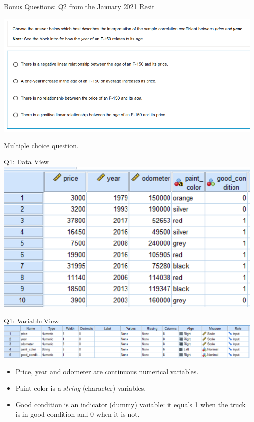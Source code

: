 \documentclass[11pt]{beamer}
\begin{document}
\begin{frame}{Bonus Questions: Q2 from the January 2021 Resit}
  \begin{center}
    \includegraphics[width=\textwidth]{f150-exam-q2.png}
  \end{center}
  Multiple choice question.
\end{frame}

\begin{frame}{Q1: Data View}
  \includegraphics[width=\textwidth]{f150-data-view.png}
\end{frame}

\begin{frame}{Q1: Variable View}
  \includegraphics[width=\textwidth]{f150-variable-view.png}
  \begin{itemize}
    \item Price, year and odometer are continuous numerical variables.
    \item Paint color is a \emph{string} (character) variables.
    \item Good condition is an indicator (dummy) variable: it equals 1 when the truck is in good condition and 0 when it is not.
  \end{itemize}
\end{frame}
\end{document}
